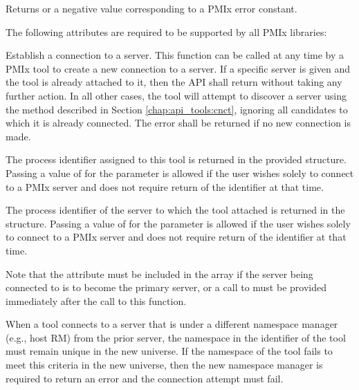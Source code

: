 Returns  or a negative value corresponding to a PMIx error constant.

\reqattrstart
The following attributes are required to be supported by all \ac{PMIx} libraries:


\reqattrend

\descr

Establish a connection to a server. This function can be called at any time by a \ac{PMIx} tool to create a new connection to a server. If a specific server is given and the tool is already attached to it, then the \ac{API} shall return  without taking any further action. In all other cases, the tool will attempt to discover a server using the method described in Section \ref{chap:api_tools:cnct}, ignoring all candidates to which it is already connected. The  error shall be returned if no new connection is made.

The process identifier assigned to this tool is returned in the provided  structure. Passing a value of  for the  parameter is allowed if the user wishes solely to connect to a \ac{PMIx} server and does not require return of the identifier at that time.

The process identifier of the server to which the tool attached is returned in the  structure. Passing a value of  for the  parameter is allowed if the user wishes solely to connect to a \ac{PMIx} server and does not require return of the identifier at that time.

Note that the  attribute must be included in the
 array if the server being connected to is to become the primary
server, or a call to  must be provided immediately
after the call to this function.

\adviceimplstart
When a tool connects to a server that is under a different namespace manager (e.g., host \ac{RM}) from the prior server, the namespace in the identifier of the tool must remain unique in the new universe. If the namespace of the tool fails to meet this criteria in the new universe, then the new namespace manager is required to return an error and the connection attempt must fail.
\adviceimplend


